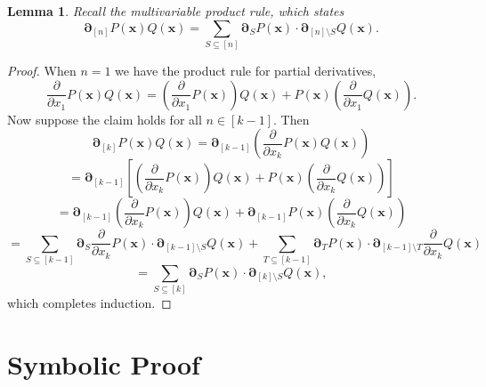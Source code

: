 \documentclass{article}
\theoremstyle{theorem}
\newtheorem{lem}[thm]{Lemma}
\theoremstyle{definition}
\begin{document}
\begin{lem}
    Recall the multivariable product rule, which states
    \[
        \boldsymbol{\partial}_{[n]}P(\boldsymbol{x})Q(\boldsymbol{x})
        =\sum_{S\subseteq [n]}\boldsymbol{\partial}_{S}P(\boldsymbol{x})\cdot\boldsymbol{\partial}_{[n]\setminus S}Q(\boldsymbol{x}).
    \]
\end{lem}
\begin{proof}
    When $n=1$ we have the product rule for partial derivatives,
    \[
        \frac{\partial}{\partial x_1}P(\boldsymbol{x})Q(\boldsymbol{x})=\left(\frac{\partial}{\partial x_1}P(\boldsymbol{x})\right)Q(\boldsymbol{x})+P(\boldsymbol{x})\left(\frac{\partial}{\partial x_1}Q(\boldsymbol{x})\right).
    \]
    Now suppose the claim holds for all $n\in[k-1]$. Then
    \[
        \boldsymbol{\partial}_{[k]}P(\boldsymbol{x})Q(\boldsymbol{x})=\boldsymbol{\partial}_{[k-1]}\left(\frac{\partial}{\partial x_k}P(\boldsymbol{x})Q(\boldsymbol{x})\right)
    \]
    \[
        =\boldsymbol{\partial}_{[k-1]}\left[\left(\frac{\partial}{\partial x_k}P(\boldsymbol{x})\right)Q(\boldsymbol{x})+P(\boldsymbol{x})\left(\frac{\partial}{\partial x_k}Q(\boldsymbol{x})\right)\right]
    \]
    \[
        =\boldsymbol{\partial}_{[k-1]}\left(\frac{\partial}{\partial x_k}P(\boldsymbol{x})\right)Q(\boldsymbol{x})+\boldsymbol{\partial}_{[k-1]}P(\boldsymbol{x})\left(\frac{\partial}{\partial x_k}Q(\boldsymbol{x})\right)
    \]
    \[
        =\sum_{S\subseteq [k-1]}\boldsymbol{\partial}_{S}\frac{\partial}{\partial x_k}P(\boldsymbol{x})\cdot\boldsymbol{\partial}_{[k-1]\setminus S}Q(\boldsymbol{x})
        +\sum_{T\subseteq [k-1]}\boldsymbol{\partial}_{T}P(\boldsymbol{x})\cdot\boldsymbol{\partial}_{[k-1]\setminus T}\frac{\partial}{\partial x_k}Q(\boldsymbol{x})
    \]
    \[
        =\sum_{S\subseteq [k]}\boldsymbol{\partial}_{S}P(\boldsymbol{x})\cdot\boldsymbol{\partial}_{[k]\setminus S}Q(\boldsymbol{x}),
    \]
    which completes induction.
\end{proof}

\section{Symbolic Proof}\label{s:sproof}
\end{document}
